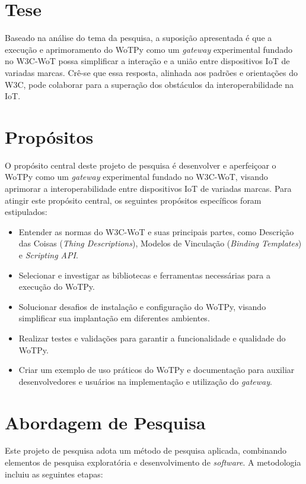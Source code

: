 \section{Tese}

Baseado na análise do tema da pesquisa, a suposição apresentada é que a execução e aprimoramento do WoTPy como um \textit{gateway} experimental fundado no W3C-WoT possa simplificar a interação e a união entre dispositivos IoT de variadas marcas. Crê-se que essa resposta, alinhada aos padrões e orientações do W3C, pode colaborar para a superação dos obstáculos da interoperabilidade na IoT.

\section{Propósitos}

O propósito central deste projeto de pesquisa é desenvolver e aperfeiçoar o WoTPy como um \textit{gateway} experimental fundado no W3C-WoT, visando aprimorar a interoperabilidade entre dispositivos IoT de variadas marcas. Para atingir este propósito central, os seguintes propósitos específicos foram estipulados:

\begin{itemize}
\item Entender as normas do W3C-WoT e suas principais partes, como Descrição das Coisas (\textit{Thing Descriptions}), Modelos de Vinculação (\textit{Binding Templates}) e \textit{Scripting API}.
\item Selecionar e investigar as bibliotecas e ferramentas necessárias para a execução do WoTPy.
\item Solucionar desafios de instalação e configuração do WoTPy, visando simplificar sua implantação em diferentes ambientes.
\item Realizar testes e validações para garantir a funcionalidade e qualidade do WoTPy.
\item Criar um exemplo de uso práticos do WoTPy e documentação para auxiliar desenvolvedores e usuários na implementação e utilização do \textit{gateway}.
\end{itemize}

\section{Abordagem de Pesquisa}

Este projeto de pesquisa adota um método de pesquisa aplicada, combinando elementos de pesquisa exploratória e desenvolvimento de \textit{software}. A metodologia incluiu as seguintes etapas:

